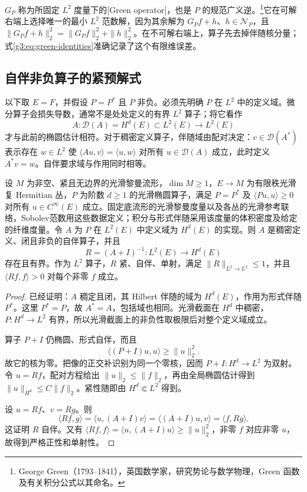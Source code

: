 \(G_P\) 称为所固定 \(L^2\) 度量下的[Green operator]，也是 \(P\) 的规范广义逆。\footnote{George Green（1793--1841），英国数学家，研究势论与数学物理，Green 函数及有关积分公式以其命名。}它在可解右端上选择唯一的最小 \(L^2\) 范数解，因为其余解为 \(G_Pf+h\)、\(h\in \mathcal N_P\)，且
\(\|G_Pf+h\|_2^2=\|G_Pf\|_2^2+\|h\|_2^2\)。在不可解右端上，算子先去掉伴随核分量；式\eqref{g3:eq:green-identities}准确记录了这个有限维误差。

\subsection{自伴非负算子的紧预解式}
\label{g3:subsec:1303:02}
以下取 \(E=F\)，并假设 \(P=P^*\) 且 \(P\) 非负。必须先明确 \(P\) 在 \(L^2\) 中的定义域。微分算子会损失导数，通常不是处处定义的有界 \(L^2\) 算子；将它看作
\[
	A:\mathcal D(A)=H^d(E)\subset L^2(E)\longrightarrow L^2(E)
\]
才与此前的椭圆估计相符。对于稠密定义算子，伴随域由配对决定：\(v\in\mathcal D(A^*)\) 表示存在 \(w\in L^2\) 使 \(\langle Au,v\rangle=\langle u,w\rangle\) 对所有 \(u\in\mathcal D(A)\) 成立，此时定义 \(A^*v=w\)。自伴要求域与作用同时相等。

\begin{theorem}\label{g3:thm:positive-elliptic-realization}
	设 \(M\) 为非空、紧且无边界的光滑黎曼流形，\(\dim M\ge1\)，\(E\to M\) 为有限秩光滑复 Hermitian 丛，\(P\) 为阶数 \(d\ge1\) 的光滑椭圆算子，满足 \(P=P^*\) 及 \(\langle Pu,u\rangle\ge0\) 对所有 \(u\in C^\infty(E)\) 成立。固定底流形的光滑黎曼度量以及各丛的光滑参考联络，Sobolev范数用这些数据定义；积分与形式伴随采用该度量的体积密度及给定的纤维度量。令 \(A\) 为 \(P\) 在 \(L^2(E)\) 中定义域为 \(H^d(E)\) 的实现。则 \(A\) 是稠密定义、闭且非负的自伴算子，并且
	\[
		R=(A+I)^{-1}:L^2(E)\longrightarrow H^d(E)
	\]
	存在且有界。作为 \(L^2\) 算子，\(R\) 紧、自伴、单射，满足 \(\|R\|_{L^2\to L^2}\le1\)，并且 \(\langle Rf,f\rangle>0\) 对每个非零 \(f\) 成立。
\end{theorem}
\begin{proof}
	已经证明：\(A\) 稠定且闭，其 Hilbert 伴随的域为 \(H^d(E)\)，作用为形式伴随 \(P^*\)。这里 \(P^*=P\)，故 \(A^*=A\)，包括域也相同。光滑截面在 \(H^d\) 中稠密，\(P:H^d\to L^2\) 有界，所以光滑截面上的非负性取极限后对整个定义域成立。

	算子 \(P+I\) 仍椭圆、形式自伴，而且
	\[
		\langle(P+I)u,u\rangle\ge\|u\|_2^2.
	\]
	故它的核为零。把像的正交补识别为同一个零核，因而 \(P+I:H^d\to L^2\) 为双射。令 \(u=Rf\)，配对方程给出 \(\|u\|_2\le\|f\|_2\)，再由全局椭圆估计得到 \(\|u\|_{H^d}\le C\|f\|_2\)。紧性随即由 \(H^d\Subset L^2\) 得到。

	设 \(u=Rf\)、\(v=Rg\)。则
	\[
		\langle Rf,g\rangle
		=\langle u,(A+I)v\rangle
		=\langle(A+I)u,v\rangle
		=\langle f,Rg\rangle.
	\]
	这证明 \(R\) 自伴。又有
	\(\langle Rf,f\rangle=\langle u,(A+I)u\rangle\ge\|u\|_2^2\)，非零 \(f\) 对应非零 \(u\)，故得到严格正性和单射性。
\end{proof}


